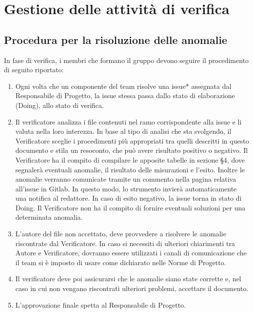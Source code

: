 \section{Gestione delle attività di verifica}
\subsection{Procedura per la risoluzione delle anomalie}
In fase di verifica, i membri che formano il gruppo devono seguire il procedimento di seguito riportato:
\begin{enumerate}
\item Ogni volta che un componente del team risolve una issue* assegnata dal Responsabile di Progetto, la issue stessa passa dallo stato di elaborazione (Doing), allo stato di verifica.
\item Il verificatore analizza i file contenuti nel ramo corrispondente alla issue e li valuta nella loro interezza. In base al tipo di analisi che sta svolgendo, il Verificatore sceglie i procedimenti più appropriati tra quelli descritti in questo documento e stila un resoconto, che può avere risultato positivo o negativo.
Il Verificatore ha il compito di compilare le apposite tabelle in sezione §4, dove segnalerà eventuali anomalie, il risultato delle misurazioni e l'esito. Inoltre le anomalie verranno comunicate tramite un commento nella pagina relativa all'issue in Gitlab. In questo modo, lo strumento invierà automaticamente una notifica al redattore. In caso di esito negativo, la issue torna in stato di Doing. Il Verificatore non ha il compito di fornire eventuali soluzioni per una determinata anomalia.
\item L'autore del file non accettato, deve provvedere a risolvere le anomalie riscontrate dal Verificatore. In caso si necessiti di ulteriori chiarimenti tra Autore e Verificatore, dovranno essere utilizzati i canali di comunicazione che il team si è imposto di usare come dichiarato nelle Norme di Progetto.
\item Il verificatore deve poi assicurarsi che le anomalie siano state corrette e, nel caso in cui non vengano riscontrati ulteriori problemi, accettare il documento.
\item L'approvazione finale spetta al Responsabile di Progetto.
\end{enumerate}


